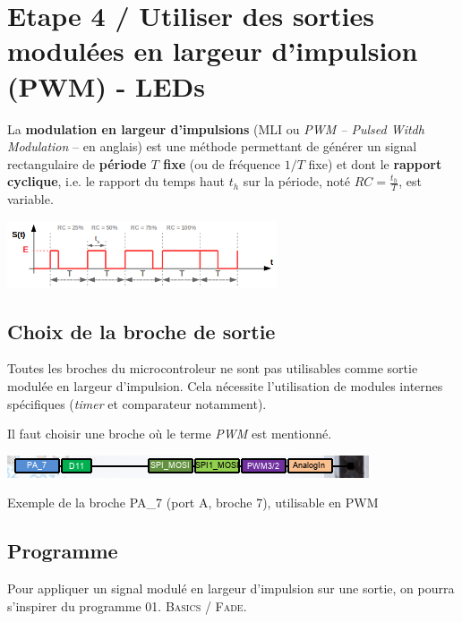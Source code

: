 \documentclass[a4paper,11pt,titlepage]{article} %
\begin{document}
\newpage
\section{Etape 4 / Utiliser des sorties modulées en largeur d'impulsion (PWM) - LEDs}

La \textbf{modulation en largeur d'impulsions} (MLI ou \textit{PWM – Pulsed Witdh Modulation} – en anglais) est une méthode permettant de générer un signal rectangulaire de \textbf{période $T$ fixe} (ou de fréquence $1/T$ fixe) et dont le \textbf{rapport cyclique}, i.e. le rapport du temps haut $t_h$ sur la période, noté $RC = \frac{t_
h}{T}$, est variable.

\begin{center}
	\includegraphics[width=0.6\textwidth]{images/MINE_ElecNum_PWM_SignalPrincipe.png}
\end{center}

\subsection{Choix de la broche de sortie}

Toutes les broches du microcontroleur ne sont pas utilisables comme sortie modulée en largeur d'impulsion. Cela nécessite l'utilisation de modules internes spécifiques (\textit{timer} et comparateur notamment).

Il faut choisir une broche où le terme \textit{PWM} est mentionné.

\begin{center}
	\includegraphics{images/nucleo_pin_functions.png}
	
	Exemple de la broche PA\_7 (port A, broche 7), utilisable en PWM
\end{center}


\subsection{Programme}

Pour appliquer un signal modulé en largeur d'impulsion sur une sortie, on pourra s'inspirer du programme \textsc{01. Basics / Fade}.
\end{document}
